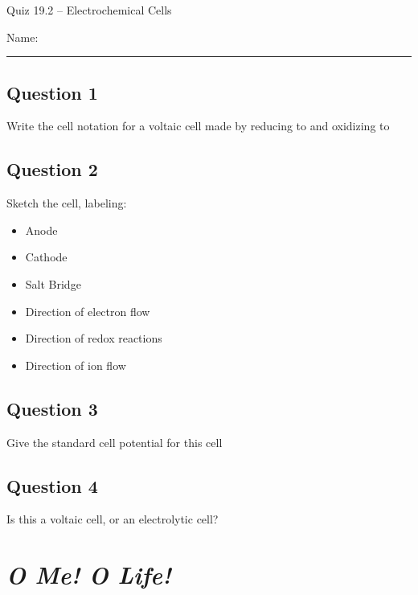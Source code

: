 \documentclass[11pt, letterpaper]{memoir}
\begin{document}
	\begin{center}
		{\large	Quiz 19.2 -- Electrochemical Cells}
	\end{center}
	{\large Name: \rule[-1mm]{4in}{.1pt} 

\subsection*{Question 1}
 Write the cell notation for a voltaic cell made by reducing  to  and oxidizing  to 
 
 \vspace{4em}
 \subsection*{Question 2}
 Sketch the cell, labeling:
 \begin{itemize}
 	\item Anode
 	\item Cathode
 	\item Salt Bridge
 	\item Direction of electron flow
 	\item Direction of redox reactions
 	\item Direction of ion flow
 \end{itemize}

\vspace{12em}
\subsection*{Question 3}
Give the standard cell potential for this cell

\vspace{4em}
\subsection*{Question 4}
Is this a voltaic cell, or an electrolytic cell?
	\newpage
	\pagestyle{empty}
	\addtocounter{page}{-1}
\section*{\emph{O Me! O Life!}}
}
\end{document}
